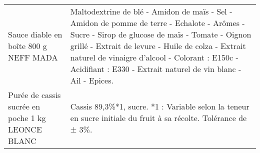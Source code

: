 \begin{longtable}{p{5cm}p{10cm}}
                                                                    Sauce diable en boîte 800 g NEFF MADA &                                                                                                                                                                                                                                                                                                                                                                                                                                                                                                                                                                                                                                                                                                                 Maltodextrine de blé - Amidon de maïs - Sel - Amidon de pomme de terre - Echalote - Arômes - Sucre - Sirop de glucose de maïs - Tomate - Oignon grillé - Extrait de levure - Huile de colza - Extrait naturel de vinaigre d'alcool - Colorant : E150c - Acidifiant : E330 - Extrait naturel de vin blanc - Ail - Epices. \\
                                                        Purée de cassis sucrée en poche 1 kg LEONCE BLANC &                                                                                                                                                                                                                                                                                                                                                                                                                                                                                                                                                                                                                                                                                                                                                                                                                                                                                                                        Cassis 89,3\%*1, sucre.  *1 : Variable selon la teneur en sucre initiale du fruit à sa récolte. Tolérance de ± 3\%. \\

\end{longtable}
